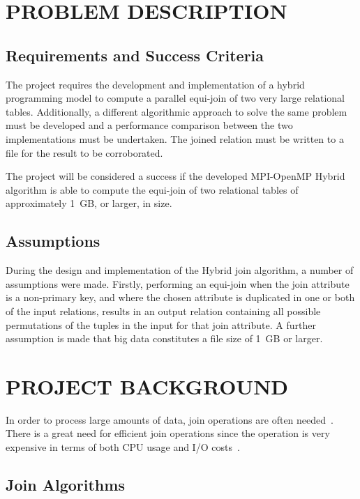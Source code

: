 \documentclass[12pt,twocolumn]{witseiepaper}
\begin{document}
\section{PROBLEM DESCRIPTION}

\subsection{Requirements and Success Criteria}

The project requires the development and implementation of a hybrid programming model to compute a parallel equi-join of two very large relational tables. Additionally, a different algorithmic approach to solve the same problem must be developed and a performance comparison between the two implementations must be undertaken. The joined relation must be written to a file for the result to be corroborated.

The project will be considered a success if the developed MPI-OpenMP Hybrid algorithm is able to compute the equi-join of two relational tables of approximately 1~GB, or larger, in size.

\subsection{Assumptions}

During the design and implementation of the Hybrid join algorithm, a number of assumptions were made. Firstly, performing an equi-join when the join attribute is a non-primary key, and where the chosen attribute is duplicated in one or both of the input relations, results in an output relation containing all possible permutations of the tuples in the input for that join attribute. A further assumption is made that big data constitutes a file size of 1~GB or larger. 

\section{PROJECT BACKGROUND}
In order to process large amounts of data, join operations are often needed~\cite{mapReduceJoin}. There is a great need for efficient join operations since the operation is very expensive in terms of both CPU usage and I/O costs~\cite{mapReduceJoin}.

\subsection{Join Algorithms}
\end{document}
